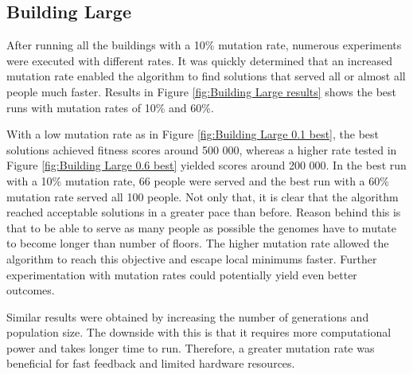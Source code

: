\newpage

\subsection{Building Large}
After running all the buildings with a 10\% mutation rate, numerous experiments were executed with different rates. It was quickly determined that an increased mutation rate enabled the algorithm to find solutions that served all or almost all people much faster. Results in Figure \ref{fig:Building Large results} shows the best runs with mutation rates of 10\% and 60\%.

With a low mutation rate as in Figure \ref{fig:Building Large 0.1 best}, the best solutions achieved fitness scores around 500 000, whereas a higher rate tested in Figure \ref{fig:Building Large 0.6 best} yielded scores around 200 000. In the best run with a 10\% mutation rate, 66 people were served and the best run with a 60\% mutation rate served all 100 people. Not only that, it is clear that the algorithm reached acceptable solutions in a greater pace than before. Reason behind this is that to be able to serve as many people as possible the genomes have to mutate to become longer than number of floors. The higher mutation rate allowed the algorithm to reach this objective and escape local minimums faster. Further experimentation with mutation rates could potentially yield even better outcomes.

Similar results were obtained by increasing the number of generations and population size. The downside with this is that it requires more computational power and takes longer time to run. Therefore, a greater mutation rate was beneficial for fast feedback and limited hardware resources.

